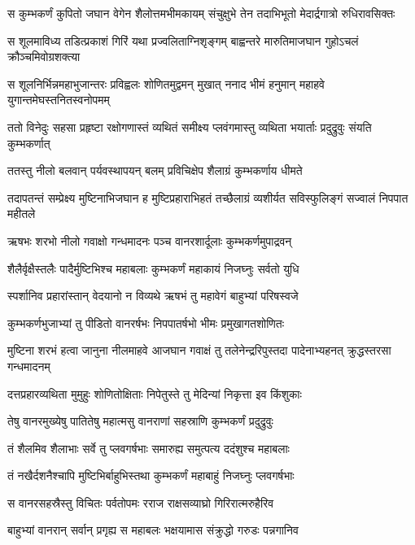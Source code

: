 \twolineshloka
{स कुम्भकर्णं कुपितो जघान वेगेन शैलोत्तमभीमकायम्}
{संचुक्षुभे तेन तदाभिभूतो मेदार्द्रगात्रो रुधिरावसिक्तः} %

\twolineshloka
{स शूलमाविध्य तडित्प्रकाशं गिरिं यथा प्रज्वलिताग्निशृङ्गम्}
{बाह्वन्तरे मारुतिमाजघान गुहोऽचलं क्रौञ्चमिवोग्रशक्त्या} %

\twolineshloka
{स शूलनिर्भिन्नमहाभुजान्तरः प्रविह्वलः शोणितमुद्वमन् मुखात्}
{ननाद भीमं हनुमान् महाहवे युगान्तमेघस्तनितस्वनोपमम्} %

\twolineshloka
{ततो विनेदुः सहसा प्रहृष्टा रक्षोगणास्तं व्यथितं समीक्ष्य}
{प्लवंगमास्तु व्यथिता भयार्ताः प्रदुद्रुवुः संयति कुम्भकर्णात्} %

\twolineshloka
{ततस्तु नीलो बलवान् पर्यवस्थापयन् बलम्}
{प्रविचिक्षेप शैलाग्रं कुम्भकर्णाय धीमते} %

\threelineshloka
{तदापतन्तं सम्प्रेक्ष्य मुष्टिनाभिजघान ह}
{मुष्टिप्रहाराभिहतं तच्छैलाग्रं व्यशीर्यत}
{सविस्फुलिङ्गं सज्वालं निपपात महीतले} %

\twolineshloka
{ऋषभः शरभो नीलो गवाक्षो गन्धमादनः}
{पञ्च वानरशार्दूलाः कुम्भकर्णमुपाद्रवन्} %

\twolineshloka
{शैलैर्वृक्षैस्तलैः पादैर्मुष्टिभिश्च महाबलाः}
{कुम्भकर्णं महाकायं निजघ्नुः सर्वतो युधि} %

\twolineshloka
{स्पर्शानिव प्रहारांस्तान् वेदयानो न विव्यथे}
{ऋषभं तु महावेगं बाहुभ्यां परिषस्वजे} %

\twolineshloka
{कुम्भकर्णभुजाभ्यां तु पीडितो वानरर्षभः}
{निपपातर्षभो भीमः प्रमुखागतशोणितः} %

\threelineshloka
{मुष्टिना शरभं हत्वा जानुना नीलमाहवे}
{आजघान गवाक्षं तु तलेनेन्द्ररिपुस्तदा}
{पादेनाभ्यहनत् क्रुद्धस्तरसा गन्धमादनम्} %

\twolineshloka
{दत्तप्रहारव्यथिता मुमुहुः शोणितोक्षिताः}
{निपेतुस्ते तु मेदिन्यां निकृत्ता इव किंशुकाः} %

\twolineshloka
{तेषु वानरमुख्येषु पातितेषु महात्मसु}
{वानराणां सहस्राणि कुम्भकर्णं प्रदुद्रुवुः} %

\twolineshloka
{तं शैलमिव शैलाभाः सर्वे तु प्लवगर्षभाः}
{समारुह्य समुत्पत्य ददंशुश्च महाबलाः} %

\twolineshloka
{तं नखैर्दशनैश्चापि मुष्टिभिर्बाहुभिस्तथा}
{कुम्भकर्णं महाबाहुं निजघ्नुः प्लवगर्षभाः} %

\twolineshloka
{स वानरसहस्रैस्तु विचितः पर्वतोपमः}
{रराज राक्षसव्याघ्रो गिरिरात्मरुहैरिव} %

\twolineshloka
{बाहुभ्यां वानरान् सर्वान् प्रगृह्य स महाबलः}
{भक्षयामास संक्रुद्धो गरुडः पन्नगानिव} %

